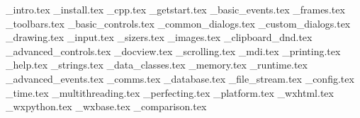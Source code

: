 \_intro.tex              %
\_install.tex            %
\_cpp.tex                %
\_getstart.tex           %
\_basic\_events.tex      %
\_frames.tex             %
\_toolbars.tex           %
\_basic\_controls.tex    %
\_common\_dialogs.tex    %
\_custom\_dialogs.tex    %
\_drawing.tex            %
\_input.tex              %
\_sizers.tex             %
\_images.tex             %
\_clipboard\_dnd.tex     %
\_advanced\_controls.tex %
\_docview.tex            %
\_scrolling.tex          %
\_mdi.tex                %
\_printing.tex           %
\_help.tex               %
\_strings.tex            %
\_data\_classes.tex      %
\_memory.tex             %
\_runtime.tex            %
\_advanced\_events.tex   %
\_comms.tex              %
\_database.tex           %
\_file\_stream.tex       %
\_config.tex             %
\_time.tex               %
\_multithreading.tex     %
\_perfecting.tex         %
\_platform.tex           %
\_wxhtml.tex             %
\_wxpython.tex           %
\_wxbase.tex             %
\_comparison.tex         %

